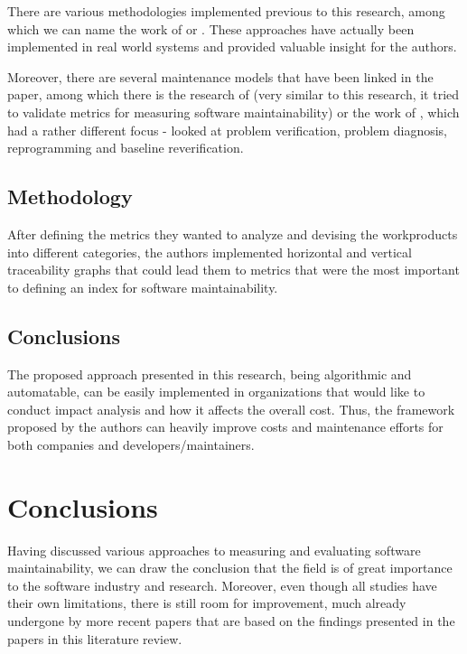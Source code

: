 \documentclass[a4paper,12pt]{article}
\begin{document}
There are various methodologies implemented previous to this research,
among which we can name the work of \citet{horqwitz1986sodos} or
\citet{penedo1984integrated}. These approaches have actually been
implemented in real world systems and provided valuable insight for
the authors.

Moreover, there are several maintenance models that have been 
linked in the paper, among which there is the research of 
\citet{martin1983software} (very similar to this research, it tried
to validate metrics for measuring software maintainability) or
the work of \citet{sharpley1977software}, which had a rather different
focus - looked at problem verification, problem diagnosis, reprogramming
and baseline reverification.

\subsection{Methodology}

After defining the metrics they wanted to analyze and devising the
workproducts into different categories, the authors implemented
horizontal and vertical traceability graphs that could lead them to
metrics that were the most important to defining an index for 
software maintainability.

\subsection{Conclusions}

The proposed approach presented in this research, being algorithmic
and automatable, can be easily implemented in organizations that would
like to conduct impact analysis and how it affects the overall cost.
Thus, the framework proposed by the authors can heavily improve
costs and maintenance efforts for both companies and 
developers/maintainers.

\section{Conclusions}

Having discussed various approaches to measuring and evaluating 
software maintainability, we can draw the conclusion that the field
is of great importance to the software industry and research. Moreover,
even though all studies have their own limitations, there is still
room for improvement, much already undergone by more recent papers
that are based on the findings presented in the papers in this 
literature review.



\end{document}
